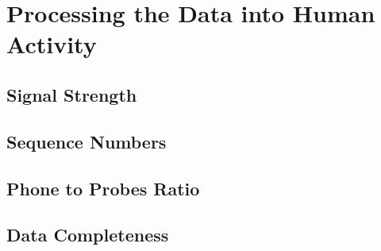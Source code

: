 \chapter{Processing the Data into Human Activity}


\section{Signal Strength}

\section{Sequence Numbers}

\section{Phone to Probes Ratio}

\section{Data Completeness}


